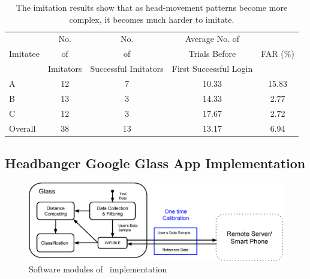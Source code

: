 \begin{table}[b]
\centering
\begin{tabular}{|l|c|c|c|c|}\hline
                               & No. &  No. &  Average No. of  &  \\
Imitatee & of & of & Trials Before & FAR (\%) \\
& Imitators & Successful Imitators & First Successful Login & \\\hline

A                   & 12                                 & 7                                                                     & 10.33                                                                                               & 15.83                        \\ \hline

B                   & 13                                 & 3                                                                     & 14.33                                                                                               & 2.77                         \\ \hline

C                   & 12                                 & 3                                                                     & 17.67                                                                                               & 2.72                          \\ \hline\hline

Overall & 38                                 & 13                                                                    & 13.17                                                                                                    & 6.94                         \\ \hline
\end{tabular}

\caption{\label{tab:imitation} The imitation results show that as head-movement patterns become more complex, it becomes much harder to imitate. }

\end{table}



\subsection{Headbanger Google Glass App Implementation}\label{subsec:app}

\begin{figure}[t]
\centering
\includegraphics [width=\columnwidth]{figure/software_arch.eps}
\caption{Software modules of \systemname~implementation}
\vspace{25 pt}
\label{fig:glass-softwarearch}
\end{figure}

